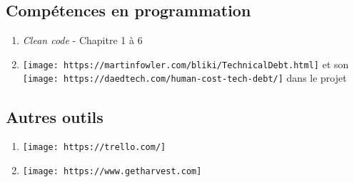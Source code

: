 \documentclass[]{article}
\providecommand{\tightlist}{%
  \setlength{\itemsep}{0pt}\setlength{\parskip}{0pt}}
\begin{document}
\subsection{Compétences en
programmation}\label{competences-en-programmation}

\begin{enumerate}
\def\labelenumi{\arabic{enumi}.}
\tightlist
\item
  \emph{Clean code} - Chapitre 1 à 6
\item
  \texttt{[image: https://martinfowler.com/bliki/TechnicalDebt.html]} et
  son \texttt{[image: https://daedtech.com/human-cost-tech-debt/]} dans
  le projet
\end{enumerate}

\subsection{Autres outils}\label{autres-outils}

\begin{enumerate}
\def\labelenumi{\arabic{enumi}.}
\tightlist
\item
  \texttt{[image: https://trello.com/]}
\item
  \texttt{[image: https://www.getharvest.com]}
\end{enumerate}
\end{document}
